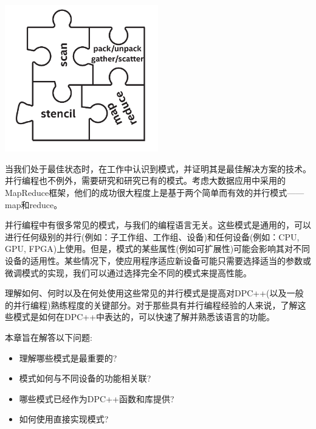 \begin{center}
	\includegraphics[width=0.5\textwidth]{content/chapter-14/images/1}
\end{center}

当我们处于最佳状态时，在工作中认识到模式，并证明其是最佳解决方案的技术。并行编程也不例外，需要研究和研究已有的模式。考虑大数据应用中采用的MapReduce框架，他们的成功很大程度上是基于两个简单而有效的并行模式——map和reduce。\par

并行编程中有很多常见的模式，与我们的编程语言无关。这些模式是通用的，可以进行任何级别的并行(例如：子工作组、工作组、设备)和任何设备(例如：CPU, GPU, FPGA)上使用。但是，模式的某些属性(例如可扩展性)可能会影响其对不同设备的适用性。某些情况下，使应用程序适应新设备可能只需要选择适当的参数或微调模式的实现，我们可以通过选择完全不同的模式来提高性能。\par

理解如何、何时以及在何处使用这些常见的并行模式是提高对DPC++(以及一般的并行编程)熟练程度的关键部分。对于那些具有并行编程经验的人来说，了解这些模式是如何在DPC++中表达的，可以快速了解并熟悉该语言的功能。\par

本章旨在解答以下问题:\par

\begin{itemize}
	\item 理解哪些模式是最重要的?
	\item 模式如何与不同设备的功能相关联?
	\item 哪些模式已经作为DPC++函数和库提供?
	\item 如何使用直接实现模式?
\end{itemize}










